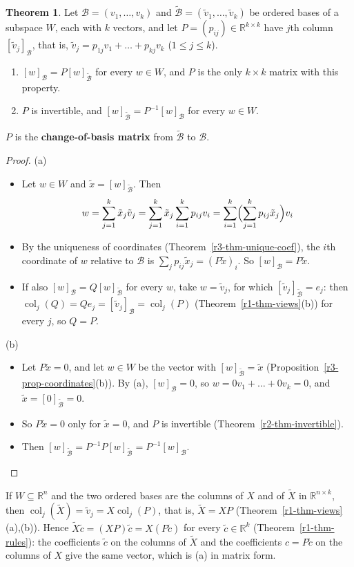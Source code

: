\documentclass[12pt]{article}
\newcommand{\R}{\mathbb R}
\DeclareMathOperator{\col}{col}
\theoremstyle{definition}
\newtheorem{theorem}{Theorem}
\begin{document}
\begin{theorem}\label{r3-thm-change-basis}
Let \(\mathcal B=(v_1,\dots,v_k)\) and \(\tilde{\mathcal B}=(\tilde v_1,\dots,\tilde v_k)\) be ordered
bases of a subspace \(W\), each with \(k\) vectors, and let \(P=(p_{ij})\in\R^{k\times k}\) have \(j\)th
column \([\tilde v_j]_{\mathcal B}\), that is, \(\tilde v_j=p_{1j}v_1+\dots+p_{kj}v_k\)
(\(1\leqslant j\leqslant k\)).
\begin{enumerate}
\item \([w]_{\mathcal B}=P[w]_{\tilde{\mathcal B}}\) for every \(w\in W\), and \(P\) is the only
\(k\times k\) matrix with this property.
\item \(P\) is invertible, and \([w]_{\tilde{\mathcal B}}=P^{-1}[w]_{\mathcal B}\) for every \(w\in W\).
\end{enumerate}
\(P\) is the \textbf{change-of-basis matrix} from \(\tilde{\mathcal B}\) to \(\mathcal B\).
\end{theorem}
\begin{proof}
(a)
\begin{itemize}
\item Let \(w\in W\) and \(\tilde x=[w]_{\tilde{\mathcal B}}\). Then
\[
w=\sum_{j=1}^k\tilde x_j\tilde v_j=\sum_{j=1}^k\tilde x_j\sum_{i=1}^kp_{ij}v_i
=\sum_{i=1}^k\Bigl(\sum_{j=1}^kp_{ij}\tilde x_j\Bigr)v_i
\]
\item By the uniqueness of coordinates (Theorem~\ref{r3-thm-unique-coef}), the \(i\)th coordinate of
\(w\) relative to \(\mathcal B\) is \(\sum_jp_{ij}\tilde x_j=(P\tilde x)_i\). So
\([w]_{\mathcal B}=P\tilde x\).
\item If also \([w]_{\mathcal B}=Q[w]_{\tilde{\mathcal B}}\) for every \(w\), take \(w=\tilde v_j\), for
which \([\tilde v_j]_{\tilde{\mathcal B}}=e_j\): then \(\col_j(Q)=Qe_j=[\tilde v_j]_{\mathcal B}=\col_j(P)\)
(Theorem~\ref{r1-thm-views}(b)) for every \(j\), so \(Q=P\).
\end{itemize}
(b)
\begin{itemize}
\item Let \(P\tilde x=0\), and let \(w\in W\) be the vector with \([w]_{\tilde{\mathcal B}}=\tilde x\)
(Proposition~\ref{r3-prop-coordinates}(b)). By (a), \([w]_{\mathcal B}=0\), so \(w=0v_1+\dots+0v_k=0\),
and \(\tilde x=[0]_{\tilde{\mathcal B}}=0\).
\item So \(P\tilde x=0\) only for \(\tilde x=0\), and \(P\) is invertible
(Theorem~\ref{r2-thm-invertible}).
\item Then \([w]_{\tilde{\mathcal B}}=P^{-1}P[w]_{\tilde{\mathcal B}}=P^{-1}[w]_{\mathcal B}\).\qedhere
\end{itemize}
\end{proof}
If \(W\subseteq\R^n\) and the two ordered bases are the columns of \(X\) and of \(\tilde X\) in
\(\R^{n\times k}\), then \(\col_j(\tilde X)=\tilde v_j=X\col_j(P)\), that is, \(\tilde X=XP\)
(Theorem~\ref{r1-thm-views}(a),(b)). Hence \(\tilde X\tilde c=(XP)\tilde c=X(P\tilde c)\) for every \(\tilde c\in\R^k\)
(Theorem~\ref{r1-thm-rules}): the coefficients \(\tilde c\) on the columns of \(\tilde X\) and the coefficients
\(c=P\tilde c\) on the columns of \(X\) give the same vector, which is (a) in matrix form.
\end{document}
